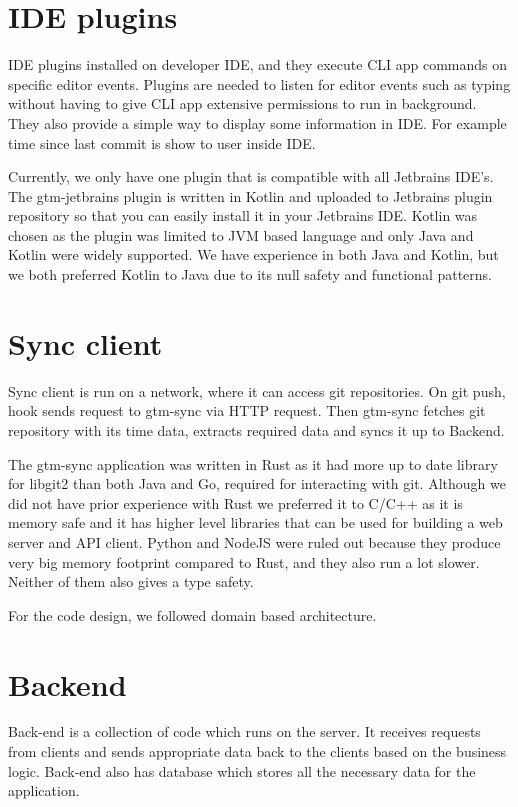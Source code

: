 \section{IDE plugins}\label{sec:ide-plugins}
IDE plugins installed on developer IDE, and they execute CLI app commands on specific editor events.
Plugins are needed to listen for editor events such as typing without having to give CLI app extensive permissions to run in background.
They also provide a simple way to display some information in IDE.
For example time since last commit is show to user inside IDE.

Currently, we only have one plugin that is compatible with all Jetbrains IDE's.
The gtm-jetbrains plugin is written in Kotlin and uploaded to Jetbrains plugin repository so that you can easily install it in your Jetbrains IDE.
Kotlin was chosen as the plugin was limited to JVM based language and only Java and Kotlin were widely supported.
We have experience in both Java and Kotlin, but we both preferred Kotlin to Java due to its null safety and functional patterns.

\section{Sync client}\label{sec:sync-client}
Sync client is run on a network, where it can access git repositories.
On git push, hook sends request to gtm-sync via HTTP request.
Then gtm-sync fetches git repository with its time data, extracts required data and syncs it up to Backend.

The gtm-sync application was written in Rust as it had more up to date library for libgit2 than both Java and Go, required for interacting with git.
Although we did not have prior experience with Rust we preferred it to C/C++ as it is memory safe and it has higher level libraries that can be
used for building a web server and API client.
Python and NodeJS were ruled out because they produce very big memory footprint compared to Rust, and they also run a lot slower.
Neither of them also gives a type safety.

For the code design, we followed domain based architecture.

\section{Backend}\label{sec:backend}
Back-end is a collection of code which runs on the server.
It receives requests from clients and sends appropriate data back to the clients based on the business logic.
Back-end also has database which stores all the necessary data for the application.

